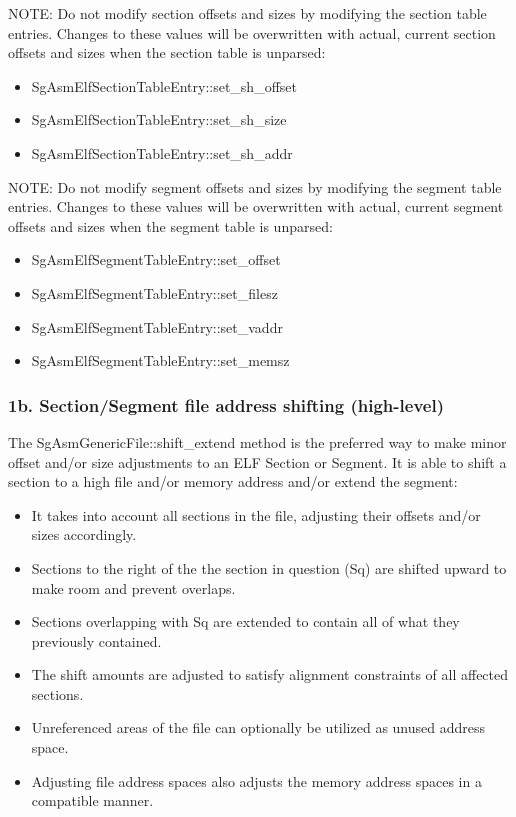    NOTE: Do not modify section offsets and sizes by modifying the section table entries. Changes to these values will be
   overwritten with actual, current section offsets and sizes when the section table is unparsed:
\begin{itemize}
	\item SgAsmElfSectionTableEntry::set\_sh\_offset
	\item SgAsmElfSectionTableEntry::set\_sh\_size
	\item SgAsmElfSectionTableEntry::set\_sh\_addr
\end{itemize}

   NOTE: Do not modify segment offsets and sizes by modifying the segment table entries. Changes to these values will be
   overwritten with actual, current segment offsets and sizes when the segment table is unparsed:
\begin{itemize}
   \item SgAsmElfSegmentTableEntry::set\_offset
   \item SgAsmElfSegmentTableEntry::set\_filesz
   \item SgAsmElfSegmentTableEntry::set\_vaddr
   \item SgAsmElfSegmentTableEntry::set\_memsz
\end{itemize}

\subsubsection{1b. Section/Segment file address shifting (high-level)}
   
   The SgAsmGenericFile::shift\_extend method is the preferred way to make minor offset and/or size adjustments to an ELF
   Section or Segment. It is able to shift a section to a high file and/or memory address and/or extend the segment:
\begin{itemize}
   \item It takes into account all sections in the file, adjusting their offsets and/or sizes accordingly.

   \item Sections to the right of the the section in question (Sq) are shifted upward to make room and prevent overlaps.

   \item Sections overlapping with Sq are extended to contain all of what they previously contained.

   \item The shift amounts are adjusted to satisfy alignment constraints of all affected sections.

   \item Unreferenced areas of the file can optionally be utilized as unused address space.

   \item Adjusting file address spaces also adjusts the memory address spaces in a compatible manner.
\end{itemize}

